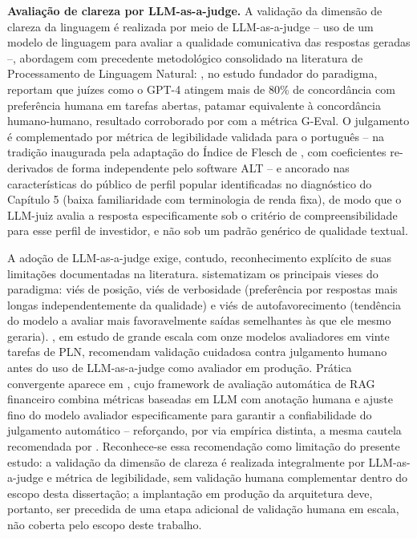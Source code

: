 \textbf{Avalia\c{c}\~ao de clareza por LLM-as-a-judge.} A valida\c{c}\~ao
da dimens\~ao de clareza da linguagem \'e realizada por meio de
LLM-as-a-judge -- uso de um modelo de linguagem para avaliar a qualidade
comunicativa das respostas geradas --, abordagem com precedente
metodol\'ogico consolidado na literatura de Processamento de Linguagem
Natural: \textcite{zheng2023}, no estudo fundador do paradigma, reportam
que ju\'izes como o GPT-4 atingem mais de 80\% de concord\^ancia com
prefer\^encia humana em tarefas abertas, patamar equivalente \`a
concord\^ancia humano-humano, resultado corroborado por \textcite{liu2023geval}
com a m\'etrica G-Eval. O julgamento \'e complementado por m\'etrica de
legibilidade validada para o portugu\^es -- na tradi\c{c}\~ao inaugurada
pela adapta\c{c}\~ao do \'Indice de Flesch de
\textcite{martins1996readability}, com coeficientes re-derivados de
forma independente pelo software ALT \autocite{moreno2023alt} -- e
ancorado nas caracter\'isticas do p\'ublico de perfil popular
identificadas no diagn\'ostico do Cap\'itulo 5 (baixa familiaridade com
terminologia de renda fixa), de
modo que o LLM-juiz avalia a resposta especificamente sob o crit\'erio de
compreensibilidade para esse perfil de investidor, e n\~ao sob um padr\~ao
gen\'erico de qualidade textual.

A ado\c{c}\~ao de LLM-as-a-judge exige, contudo, reconhecimento
expl\'icito de suas limita\c{c}\~oes documentadas na literatura.
\textcite{li2024llmjudges} sistematizam os principais vieses do
paradigma: vi\'es de posi\c{c}\~ao, vi\'es de verbosidade (prefer\^encia
por respostas mais longas independentemente da qualidade) e vi\'es de
autofavorecimento (tend\^encia do modelo a avaliar mais favoravelmente
sa\'idas semelhantes \`as que ele mesmo geraria). \textcite{bavaresco2025},
em estudo de grande escala com onze modelos avaliadores em vinte tarefas
de PLN, recomendam valida\c{c}\~ao cuidadosa contra julgamento humano
antes do uso de LLM-as-a-judge como avaliador em produ\c{c}\~ao.
Pr\'atica convergente aparece em \textcite{wang2025omnieval}, cujo
framework de avalia\c{c}\~ao autom\'atica de RAG financeiro combina
m\'etricas baseadas em LLM com anota\c{c}\~ao humana e ajuste fino do
modelo avaliador especificamente para garantir a confiabilidade do
julgamento autom\'atico -- refor\c{c}ando, por via emp\'irica distinta, a
mesma cautela recomendada por \textcite{bavaresco2025}.
Reconhece-se essa recomenda\c{c}\~ao como limita\c{c}\~ao do presente
estudo: a valida\c{c}\~ao da dimens\~ao de clareza \'e realizada
integralmente por LLM-as-a-judge e m\'etrica de legibilidade, sem
valida\c{c}\~ao humana complementar dentro do escopo desta disserta\c{c}\~ao;
a implanta\c{c}\~ao em produ\c{c}\~ao da arquitetura deve, portanto, ser
precedida de uma etapa adicional de valida\c{c}\~ao humana em escala,
n\~ao coberta pelo escopo deste trabalho.

